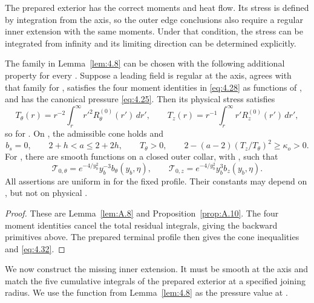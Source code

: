The prepared exterior has the correct moments and heat flow. Its stress is defined by integration from the axis, so the outer edge conclusions also require a regular inner extension with the same moments. Under that condition, the stress can be integrated from infinity and its limiting direction can be determined explicitly.

\begin{lemma}\label{lem:4.9}
The family in Lemma~\ref{lem:4.8} can be chosen with the following additional property for every . Suppose a leading field is regular at the axis, agrees with that family for , satisfies the four moment identities in \eqref{eq:4.28} as functions of , and has the canonical pressure \eqref{eq:4.25}. Then its physical stress  satisfies
\[
  T_\theta(r)=r^{-2}\int_r^\infty r'^2R_\theta^{(0)}(r')\,dr',
  \qquad
  T_z(r)=r^{-1}\int_r^\infty r'R_z^{(0)}(r')\,dr',
\]
so  for . On , the admissible cone holds and
\[
  b_s=0,\qquad 2+h<a\leq2+2h,\qquad T_\theta>0,
  \qquad 2-(a-2)(T_z/T_\theta)^2\geq\kappa_o>0.
\]
For , there are smooth functions  on a closed outer collar, with , such that
\begin{equation}
  \mathcal{T}_{0,\theta}=e^{-4/y_b^2}y_b^{-3}b_\theta(y_b,\eta),
  \qquad
  \mathcal{T}_{0,z}=e^{-4/y_b^2}y_b^3b_z(y_b,\eta).
  \tag{4.32}\label{eq:4.32}
\end{equation}
All assertions are uniform in  for the fixed profile. Their constants may depend on , but not on physical .
\end{lemma}

\begin{proof}
These are Lemma~\ref{lem:A.8} and Proposition~\ref{prop:A.10}. The four moment identities cancel the total residual integrals, giving the backward primitives above. The prepared terminal profile then gives the cone inequalities and \eqref{eq:4.32}.
\end{proof}

We now construct the missing inner extension. It must be smooth at the axis and match the five cumulative integrals of the prepared exterior at a specified joining radius. We use the function  from Lemma~\ref{lem:4.8} as the pressure value at .

